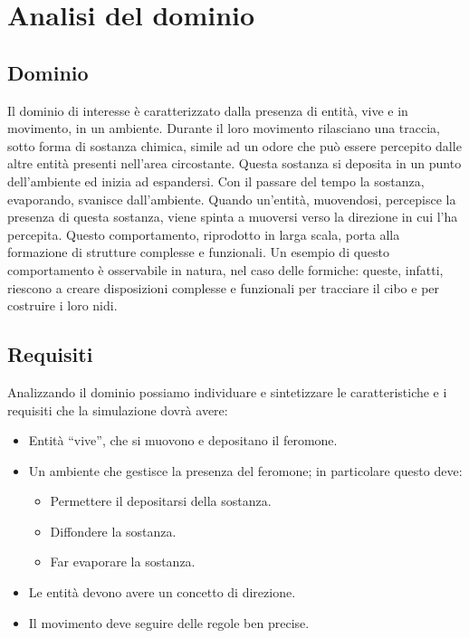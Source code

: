 \chapter{Analisi del dominio}
\section{Dominio}
Il dominio di interesse è caratterizzato dalla presenza di entità, vive e in movimento, in un ambiente.
Durante il loro movimento rilasciano una traccia,
sotto forma di sostanza chimica,
simile ad un odore che può essere percepito dalle altre entità presenti nell'area circostante. Questa sostanza
si deposita in un punto dell'ambiente ed inizia ad espandersi. Con il passare del tempo la sostanza, evaporando, svanisce dall'ambiente.
Quando un'entità, muovendosi, percepisce la presenza di questa sostanza, viene spinta a muoversi verso la direzione 
in cui l'ha percepita. Questo comportamento, riprodotto in larga scala, porta alla formazione di strutture complesse e funzionali.
Un esempio di questo comportamento è osservabile in natura, nel caso delle formiche: queste, infatti, riescono a 
creare disposizioni complesse e funzionali per tracciare il cibo e per costruire i loro nidi.
\section{Requisiti}
Analizzando il dominio possiamo individuare e sintetizzare
le caratteristiche e i requisiti che la simulazione dovrà avere:
\begin{itemize}
    \item Entità ``vive'', che si muovono e depositano il feromone.
    \item Un ambiente che gestisce la presenza del feromone; in particolare questo deve:
    \begin{itemize}
        \item Permettere il depositarsi della sostanza.
        \item Diffondere la sostanza.
        \item Far evaporare la sostanza.
    \end{itemize}
    \item Le entità devono avere un concetto di direzione.
    \item Il movimento deve seguire delle regole ben precise.
\end{itemize}

